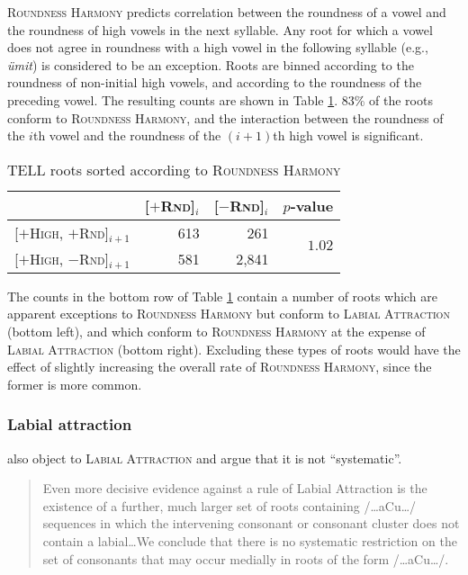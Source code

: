 \textsc{Roundness Harmony} predicts correlation between the roundness of a vowel and the roundness of high vowels in the next syllable. Any root for which a vowel does not agree in roundness with a high vowel in the following syllable (e.g., \emph{ümit}) is considered to be an exception. Roots are binned according to the roundness of non-initial high vowels, and according to the roundness of the preceding vowel. 
The resulting counts are shown in Table \ref{rhs}. 83\% of the roots conform to \textsc{Roundness Harmony}, and the interaction between the roundness of the $i$th vowel and the roundness of the $(i +1)$th high vowel is significant.

\begin{table}[t]
\centering
\begin{tabular}{lrrr}
\toprule
                                              & [$+$\textsc{Rnd}]$_i$ & [$-$\textsc{Rnd}]$_i$ & $p$-value                      \\
\midrule
\buf{}[$+$\textsc{High}, $+$\textsc{Rnd}]$_{i+1}$ & 613                   &   261                 & \multirow{2}{*}{$1.02$\e{-36}} \\
\buf{}[$+$\textsc{High}, $-$\textsc{Rnd}]$_{i+1}$ & 581                   & 2,841                                                  \\
\bottomrule
\end{tabular}
\caption{TELL roots sorted according to \textsc{Roundness Harmony}}
\label{rhs}
\end{table}

\noindent
The counts in the bottom row of Table \ref{rhs} contain a number of roots which are apparent exceptions to \textsc{Roundness Harmony} but conform to \textsc{Labial Attraction} (bottom left), and which conform to \textsc{Roundness Harmony} at the expense of \textsc{Labial Attraction} (bottom right). Excluding these types of roots would have the effect of slightly increasing the overall rate of \textsc{Roundness Harmony}, since the former is more common.

\subsubsection{Labial attraction}

\citet{Clements1982} also object to \textsc{Labial Attraction} and argue that it is not ``systematic''.

\begin{quote}
Even more decisive evidence against a rule of Labial Attraction is the existence of a further, much larger set of roots containing /\ldots{}aCu\ldots/ sequences in which the intervening consonant or consonant cluster does not contain a labial\ldots{}We conclude that there is no systematic restriction on the set of consonants that may occur medially in roots of the form /\ldots{}aCu\ldots/. \citep[225]{Clements1982}
\end{quote}

